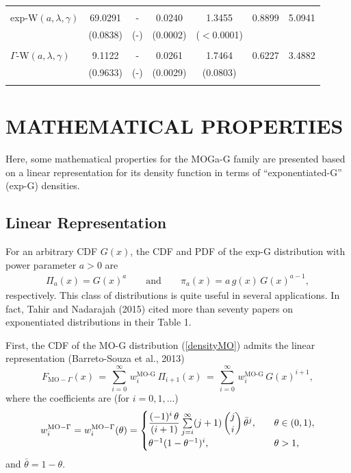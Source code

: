 \documentclass[twoside,leqno,11pt]{article}
\begin{document}
\begin{table}[H]
{\begin{tabular}{lcccccc}
 & & & & &  \\
 exp-W$(a,\lambda,\gamma)$   &    69.0291  & - &   0.0240 & 1.3455 &   0.8899   & 5.0941 \\
                          &   (0.0838) & (-) & (0.0002) & ($<$0.0001)   &  & \\

 & & & & &  \\
 $\Gamma$-W$(a,\lambda,\gamma)$    & 9.1122   & - &  0.0261 & 1.7464 &    0.6227 & 3.4882  \\
                             &  (0.9633)&  (-)&  (0.0029) & (0.0803)     &  & \\

 & & & & &  \\
                          \hline
\end{tabular}}
\end{table}


\section{MATHEMATICAL PROPERTIES}\label{properties}

Here, some mathematical properties for the MOGa-G family are presented based on a linear representation for its density 
function in terms of ``exponentiated-G'' (exp-G) densities.

\subsection{Linear Representation}

For an arbitrary CDF $G(x)$, the CDF and PDF of the exp-G distribution with power parameter $a>0$ are
\begin{eqnarray*}
\Pi_a(x)=G(x)^a\qquad\text{and}\qquad\pi_a(x)=a\,g(x)\,G(x)^{a-1},
\end{eqnarray*}
respectively. This class of distributions is quite useful 
in several applications. In fact, Tahir and Nadarajah (2015)
cited more than seventy papers on exponentiated distributions 
in their Table 1.

First, the CDF of the MO-G distribution (\ref{densityMO}) 
admits the linear representation (Barreto-Souza et al., 2013) \cite{Barreto-Souza}
\begin{equation}
F_{\text{MO}-\Gamma}(x) 
\,=\,
\sum^{\infty}_{i=0}\,w_i^{\text{MO-G}}\,\Pi_{i+1}(x)\,=\,\sum^{\infty}_{i=0}\,w_i^{\text{MO-G}}\,G(x)^{i+1},
\label{EXP44}
\end{equation}
where the coefficients are (for $i=0,1,\ldots$)
\[
w_i^{\text{MO}-\Gamma}=w_i^{\text{MO}-\Gamma}(\theta) =
\begin{cases}
\dfrac{(-1)^i\,\theta}{(i+1)} \sum\limits^{\infty}_{j=i}(j+1)\,\dbinom{j}{i}\,\bar{\theta}^j,& \quad \theta\in (0,1),\\
\theta^{-1} (1-\theta^{-1})^i,& \quad \theta>1,
\end{cases}
\]
and $\bar{\theta}=1-\theta$.
\end{document}
